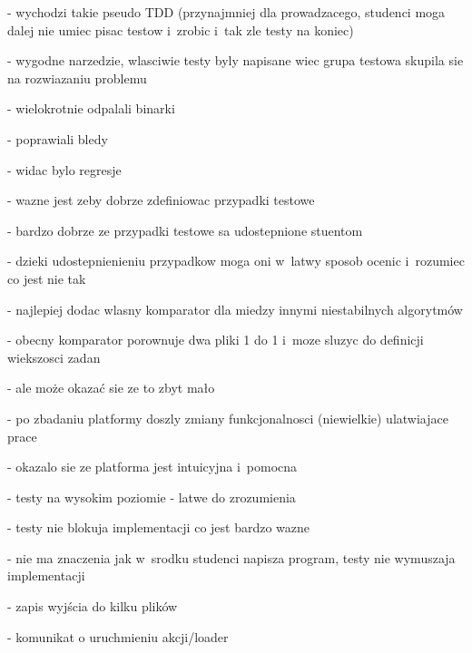 - wychodzi takie pseudo TDD (przynajmniej dla prowadzacego, studenci moga dalej nie umiec pisac testow i~zrobic i~tak zle testy na koniec)

- wygodne narzedzie, wlasciwie testy byly napisane wiec grupa testowa skupila sie na rozwiazaniu problemu

- wielokrotnie odpalali binarki

- poprawiali bledy

- widac bylo regresje

- wazne jest zeby dobrze zdefiniowac przypadki testowe

- bardzo dobrze ze przypadki testowe sa udostepnione stuentom

- dzieki udostepnienieniu przypadkow moga oni w~latwy sposob ocenic i~rozumiec co jest nie tak

- najlepiej dodac wlasny komparator dla miedzy innymi niestabilnych algorytmów

- obecny komparator porownuje dwa pliki 1 do 1 i~moze sluzyc do definicji wiekszosci zadan

- ale może okazać sie ze to zbyt mało

- po zbadaniu platformy doszly zmiany funkcjonalnosci (niewielkie) ulatwiajace prace

- okazalo sie ze platforma jest intuicyjna i~pomocna

- testy na wysokim poziomie - latwe do zrozumienia

- testy nie blokuja implementacji co jest bardzo wazne

- nie ma znaczenia jak w~srodku studenci napisza program, testy nie wymuszaja implementacji

- zapis wyjścia do kilku plików

- komunikat o uruchmieniu akcji/loader



